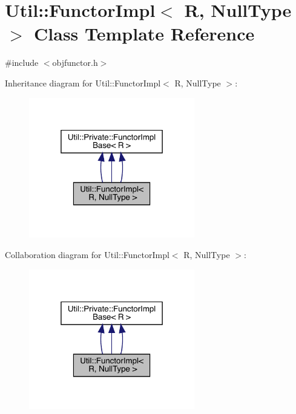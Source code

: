 \hypertarget{classUtil_1_1FunctorImpl_3_01R_00_01NullType_01_4}{}\section{Util\+:\+:Functor\+Impl$<$ R, Null\+Type $>$ Class Template Reference}
\label{classUtil_1_1FunctorImpl_3_01R_00_01NullType_01_4}


{\ttfamily \#include $<$objfunctor.\+h$>$}



Inheritance diagram for Util\+:\+:Functor\+Impl$<$ R, Null\+Type $>$\+:
\nopagebreak
\begin{figure}[H]
\begin{center}
\leavevmode
\includegraphics[width=205pt]{d2/dde/classUtil_1_1FunctorImpl_3_01R_00_01NullType_01_4__inherit__graph}
\end{center}
\end{figure}


Collaboration diagram for Util\+:\+:Functor\+Impl$<$ R, Null\+Type $>$\+:
\nopagebreak
\begin{figure}[H]
\begin{center}
\leavevmode
\includegraphics[width=205pt]{d6/da0/classUtil_1_1FunctorImpl_3_01R_00_01NullType_01_4__coll__graph}
\end{center}
\end{figure}
